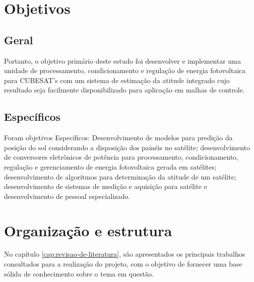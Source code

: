 \documentclass[
	12pt,				%
	openright,			%
	oneside,			%
	a4paper,			%
	english,			%
	brazil				%
	]{abntex2}
\begin{document}
\section{Objetivos}

\subsection*{Geral}

Portanto, o objetivo primário deste estudo foi desenvolver e implementar uma unidade de processamento, condicionamento e regulação de energia fotovoltaica para CUBESAT’s com um sistema de estimação da atitude integrado cujo resultado seja facilmente disponibilizado para aplicação em malhas de controle.
%
\subsection*{Específicos}

 Foram objetivos Específicos: Desenvolvimento de modelos para predição da posição do sol considerando a disposição dos painéis no satélite; desenvolvimento de conversores eletrônicos de potência para processamento, condicionamento, regulação e gerenciamento de energia fotovoltaica gerada em satélites; desenvolvimento de algoritmos para determinação da atitude de um satélite; desenvolvimento de sistemas de medição e aquisição para satélite e desenvolvimento de pessoal especializado.
%

\section{Organização e estrutura}



No capítulo \ref{cap:revisao-de-literatura}, são apresentados os principais trabalhos consultados para a realização do projeto, com o objetivo de fornecer uma base sólida de conhecimento sobre o tema em questão.
\end{document}
